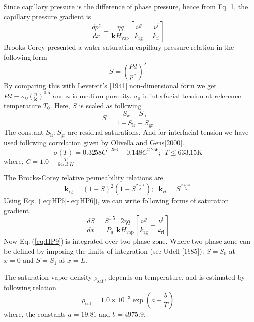 Since capillary pressure is the difference of phase pressure, hence from Eq. 1, the capillary pressure gradient is
\begin{equation}
\frac{d p^c}{d x} = \frac{\eta q}{\mathbf k H_{\mathrm {vap}}}\left[\frac{\nu^g}{k_{\mathrm {rg}}} + \frac{\nu^l}{k_{\mathrm {rl}}}\right]
\label{eq:HP5}
\end{equation}
Brooks-Corey presented a water saturation-capillary pressure relation in the following form
\begin{equation}
S=\left(\frac{Pd}{p^c}\right)^\lambda
\label{eq:HP6}
\end{equation}
By comparing this with Leverett's [1941] non-dimensional form we get $Pd=\sigma_0\left(\frac{n}{\mathbf k}\right)^{0.5}$ and $n$ is medium porosity. $\sigma_0$ is interfacial tension at reference temperature $T_0$. Here, $S$ is scaled as following 
\begin{equation}
S=\frac{S_{\mathrm {w}}-S_{\mathrm {lr}}}{1-S_{\mathrm {lr}}-S_{\mathrm {gr}}}
\label{eq:HP7}
\end{equation}
The constant $S_{\mathrm {lr}}; S_{\mathrm {gr}}$ are residual saturations. And for interfacial tension we have used following correlation given by Olivella and Gens[2000].
\begin{equation}
\sigma( T)={0.3258C^{1.256}} - {0.148C^{2.256}};~~ T\le 633.15 \mathrm K
\label{eq:surface_tension}
\end{equation}
where, $C=1.0-\frac{T}{647.3~K}$

The Brooks-Corey relative permeability relations are 
\begin{equation}
\mathbf k_{\mathrm {rg}}=\left(1-S\right)^2 \left(1-S^{\frac{2+\lambda}{\lambda}}\right);~~~\mathbf k_{rl}=S^{\frac{2+3\lambda}{\lambda}}
\label{eq:HP8}
\end{equation}
Using Eqs. (\ref{eq:HP5}-\ref{eq:HP6}), we can write following forms of saturation gradient.
\begin{equation}
\frac{d S}{d x}=\frac{S^{1.5}}{P_d}\frac{2\eta q}{\mathbf k H_{\mathrm {vap}}}\left[\frac{\nu^g}{k_{\mathrm {rg}}} + \frac{\nu^l}{k_{\mathrm {rl}}}\right]
\label{eq:HP9}
\end{equation}
Now Eq. (\ref{eq:HP9}) is integrated over two-phase zone. Where two-phase zone can be defined by imposing the limits of integration (see Udell [1985]): $S=S_0$ at $x=0$ and $S=S_1$ at $x=L$.

The saturation vapor density $\rho_{\mathrm {sat}}$, depends on temperature, and is estimated by following relation
\begin{equation}
\rho_{\mathrm {sat}}=1.0\times10^{-3}\exp\left(a-\frac{b}{T}\right)
\label{eq:HP10}
\end{equation}
where, the constants $a=19.81$ and $b=4975.9$.

